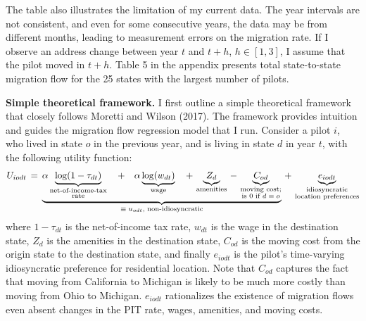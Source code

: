 \documentclass[11pt]{article}
\begin{document}
The table also illustrates the limitation of my current data. The year intervals are not consistent, and even for some consecutive years, the data may be from different months, leading to measurement errors on the migration rate. If I observe an address change between year $t$ and $t + h$, $h \in [1, 3]$, I assume that the pilot moved in $t+h$. Table 5 in the appendix presents total state-to-state migration flow for the 25 states with the largest number of pilots.

\textbf{Simple theoretical framework.}  I first outline a simple theoretical framework that closely follows Moretti and Wilson (2017). The framework provides intuition and guides the migration flow regression model that I run. Consider a pilot $i$, who lived in state $o$ in the previous year, and is living in state $d$ in year $t$, with the following utility function:
\begin{align}
	U_{iodt} \,= \, 
	\underbrace{\alpha \underbrace{\log(1 - \tau_{dt})}_{\substack{\text{net-of-income-tax}\\\text{rate}}}
		\quad + \quad \alpha \underbrace{\log(w_{dt})}_\text{wage} 
		\quad + \, \underbrace{Z_d}_\text{amenities} 
		\, - \, \underbrace{C_{od}}_{\substack{\text{moving cost;}\\\text{is $0$ if $d = o$}}}
	}_\text{{\color{black}$\equiv u_{odt}$, non-idiosyncratic}}
	\, + \, \underbrace{e_{iodt}}_{\substack{\text{idiosyncratic}\\\text{location preferences}}}
\end{align}
where  $1 - \tau_{dt}$ is the net-of-income tax rate, $w_{dt}$ is the wage in the destination state, $Z_d$ is the amenities in the destination state, $C_{od}$ is the moving cost from the origin state to the destination state, and finally $e_{iodt}$ is the pilot's time-varying idiosyncratic preference for residential location. Note that $C_{od}$ captures the fact that moving from California to Michigan is likely to be much more costly than moving from Ohio to Michigan. $e_{iodt}$ rationalizes the existence of migration flows even absent changes in the PIT rate, wages, amenities, and moving costs.
\end{document}
